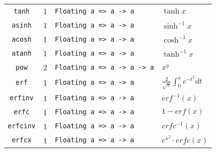 \begin{longtable}[c]{ccll}
  \texttt{tanh} & 1 & \texttt{Floating a => a -> a} & $\tanh x$\\
  \texttt{asinh} & 1 & \texttt{Floating a => a -> a} & $\sinh^{-1} x$\\
  \texttt{acosh} & 1 & \texttt{Floating a => a -> a} & $\cosh^{-1} x$\\
  \texttt{atanh} & 1 & \texttt{Floating a => a -> a} & $\tanh^{-1} x$\\
  \texttt{pow} & 2 & \texttt{Floating a => a -> a -> a} & $x^y$\\
  \texttt{erf} & 1 & \texttt{Floating a => a -> a} & $\frac{2}{\sqrt{\pi}}\int_0^x e^{-t^2}dt$\\
  \texttt{erfinv} & 1 & \texttt{Floating a => a -> a} & $erf^{-1}(x)$\\
  \texttt{erfc} & 1 & \texttt{Floating a => a -> a} & $1-erf(x)$\\
  \texttt{erfcinv} & 1 & \texttt{Floating a => a -> a} & $erfc^{-1}(x)$\\
  \texttt{erfcx} & 1 & \texttt{Floating a => a -> a} & $e^{x^2}\cdot{}erfc(x)$\\


\end{longtable}
